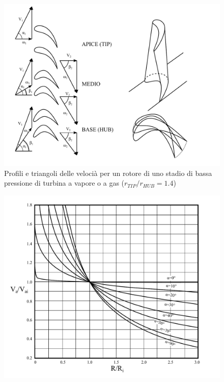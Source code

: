 \begin{figure}
\centering
  \includegraphics[width=\textwidth]{fig/TurbVortLib.pdf}
\caption{Profili e triangoli delle velocià per un rotore di uno stadio di bassa pressione di turbina a vapore o a gas ($r_{TIP}/r_{HUB} =1.4$)}
\label{fig:TurbVortLib}
\end{figure}



\begin{figure}
\centering
  \includegraphics[width=\textwidth]{fig/AngPalCost.pdf}
\caption{}
\label{fig:AngPalCost}
\end{figure}

